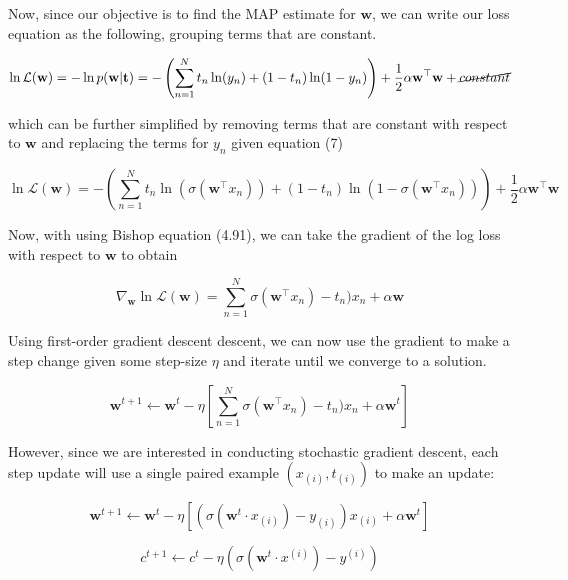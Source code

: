 \documentclass[12pt]{extarticle}
\begin{document}
Now, since our objective is to find the MAP estimate for $\mathbf{w}$, we can write our loss equation as the following, grouping terms that are constant.

\begin{equation}
    \ln \mathcal{L}(\mathbf{w}) = - \ln p(\textbf{w}|\textbf{t}) = - \left( \sum_{n=1}^N t_n\ln (y_n) + (1-t_n) \ln (1-y_n) \right) + \frac{1}{2} \alpha \mathbf{w}^\top \mathbf{w} + \cancel{constant} \\
\end{equation}

which can be further simplified by removing terms that are constant with respect to $\mathbf{w}$ and replacing the terms for $y_n$ given equation (7)

\begin{equation}
    \ln \mathcal{L}(\mathbf{w}) = - \left( \sum_{n=1}^N t_n\ln (\sigma(\textbf{w}^\top x_n)) + (1-t_n) \ln (1-\sigma(\textbf{w}^\top x_n)) \right) + \frac{1}{2} \alpha \mathbf{w}^\top \mathbf{w}
\end{equation}

Now, with using Bishop equation (4.91), we can take the gradient of the log loss with respect to $\mathbf{w}$ to obtain

\begin{equation}
     \nabla_\mathbf{w} \ln \mathcal{L}(\mathbf{w}) =  \sum_{n=1}^N \sigma(\textbf{w}^\top x_n) - t_n)x_n + \alpha \mathbf{w}
\end{equation}

Using first-order gradient descent descent, we can now use the gradient to make a step change given some step-size $\eta$ and iterate until we converge to a solution.

\begin{equation}
\mathbf{w}^{t+1} \leftarrow \mathbf{w}^{t} - \eta \left[\sum_{n=1}^N \sigma(\textbf{w}^\top x_n) - t_n)x_n + \alpha \mathbf{w}^{t} \right]
\end{equation}

However, since we are interested in conducting stochastic gradient descent, each step update will use a single paired example $(x_{(i)}, t_{(i)})$ to make an update:

\begin{equation}
\mathbf{w}^{t+1} \leftarrow \mathbf{w}^{t} - \eta \left[ \left(\sigma(\mathbf{w}^t \cdot x_{(i)}) - y_{(i)}\right) x_{(i)} + \alpha \mathbf{w}^{t} \right]
\end{equation}

\begin{equation}
c^{t+1} \leftarrow c^{t} - \eta (\sigma(\mathbf{w}^t \cdot x^{(i)}) - y^{(i)})
\end{equation}
\end{document}
